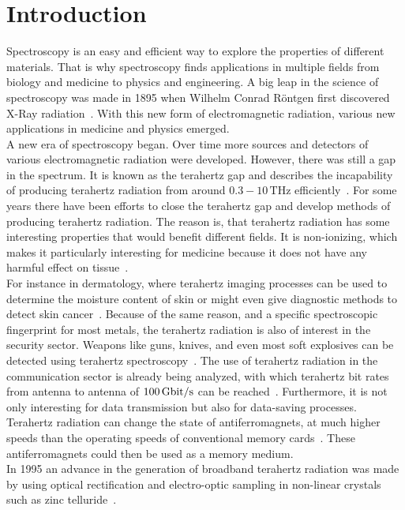 \chapter{Introduction}
Spectroscopy is an easy and efficient way to explore the properties of different materials.
That is why spectroscopy finds applications in multiple fields from biology and medicine to physics and engineering.
A big leap in the science of spectroscopy was made in 1895 when Wilhelm Conrad Röntgen first discovered X-Ray radiation~\cite{roentgen}.
With this new form of electromagnetic radiation, various new applications in medicine and physics emerged.
\\
A new era of spectroscopy began.
Over time more sources and detectors of various electromagnetic radiation were developed.
However, there was still a gap in the spectrum.
It is known as the terahertz gap and describes the incapability of producing terahertz radiation from around $0.3-10\,\si{\tera\hertz}$ efficiently~\cite{THzgap_applications}.
For some years there have been efforts to close the terahertz gap and develop methods of producing terahertz radiation.
The reason is, that terahertz radiation has some interesting properties that would benefit different fields.
It is non-ionizing, which makes it particularly interesting for medicine because it does not have any harmful effect on tissue~\cite{THzgap_applications}.
\\
For instance in dermatology, where terahertz imaging processes can be used to determine the moisture content of skin or might even give diagnostic methods to detect skin cancer~\cite{terahertz_dermatology}. 
Because of the same reason, and a specific spectroscopic fingerprint for most metals, the terahertz radiation is also of interest in the security sector.
Weapons like guns, knives, and even most soft explosives can be detected using terahertz spectroscopy~\cite{THzgap_applications, thz_explosive_detec}.
The use of terahertz radiation in the communication sector is already being analyzed, with which terahertz bit rates from antenna to antenna of $\SI{100}{\giga\bit\per\second}$ can be reached~\cite{communication}.
Furthermore, it is not only interesting for data transmission but also for data-saving processes.
Terahertz radiation can change the state of antiferromagnets, at much higher speeds than the operating speeds of conventional memory cards~\cite{datasaving}.
These antiferromagnets could then be used as a memory medium.
\\
In 1995 an advance in the generation of broadband terahertz radiation was made by using optical rectification and electro-optic sampling in non-linear crystals such as zinc telluride~\cite{first_eos_wu_zhang, ZnTe_Nahata_Weling_1996}.
